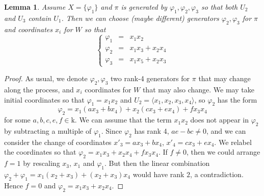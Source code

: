 \documentclass[10pt,reqno]{amsart}
\newcommand{\f}{\varphi}
\newcommand{\kk}{\mathrm{k}}
\newtheorem{lemma}[theorem]{Lemma}
\theoremstyle{definition}
\begin{document}
\begin{lemma}\label{lem:case5-3-13}
Assume $X=\{\f_1\}$ and $\pi$ is generated by $\f_1, \f_2, \f_3$ so that both $U_2$ and $U_3$ contain $U_1$. Then we can choose (maybe different) generators $\f_2, \f_3$ for $\pi$ and coordinates $x_i$ for $W$ so that
\[ 
\left\{\begin{array}{ccl}
 \f_1 & = & x_1x_2\\
 \f_2 & = & x_1x_3+x_2x_4\\
 \f_3 & = & x_1x_5+x_2x_3
\end{array}\right.
\]
\end{lemma}
\begin{proof}
As usual, we denote $\f_2, \f_3$ two rank-4 generators for $\pi$ that may change along the process, and $x_i$ coordinates for $W$ that may also change.
We may take initial coordinates so that $\f_1=x_1x_2$ and $U_2=\langle x_1,x_2,x_3,x_4\rangle$, so $\f_2$ has the form
\[
\f_2=x_1(ax_3+bx_4)+x_2(cx_3+ex_4)+fx_3x_4
\]
for some $a,b,c,e,f\in\kk$. We can assume that the term $x_1x_2$ does not appear in $\f_2$ by subtracting a multiple of $\f_1$. Since $\f_2$ has rank 4, $ae-bc\neq 0$, and we can consider the change of coordinates $x'_3=ax_3+bx_4$, $x'_4=cx_3+ex_4$. We relabel the coordinates so that $\f_2=x_1x_3+x_2x_4+fx_3x_4$.
If $f \ne 0$, then we could arrange $f=1$ by rescaling $x_3$, $x_1$ and $\f_1$. But then the linear combination $\f_2+ \f_1=x_1(x_2+x_3)+(x_2+x_3)x_4$ would have rank $2$, a contradiction. Hence $f=0$ and $\f_2=x_1x_3+x_2x_4$. 


\end{proof}
\end{document}
